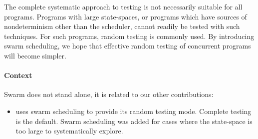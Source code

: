The complete systematic approach to testing is not necessarily
suitable for all programs.  Programs with large state-spaces, or
programs which have sources of nondeterminism other than the
scheduler, cannot readily be tested with such techniques.  For such
programs, random testing is commonly used.  By introducing swarm
scheduling, we hope that effective random testing of concurrent
programs will become simpler.

\paragraph{Context}
Swarm does not stand alone, it is related to our other contributions:

\begin{itemize}
\item {} uses swarm scheduling to provide its random
  testing mode.  Complete testing is the default.  Swarm scheduling
  was added for cases where the state-space is too large to
  systematically explore.
\end{itemize}
